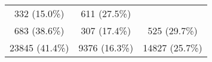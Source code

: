 \documentclass[10pt,]{article}
\begin{document}
\begin{longtable}[c]{@{}ccc@{}}
\begin{minipage}[t]{0.22\columnwidth}
332 (15.0\%)
\strut\end{minipage} &
\begin{minipage}[t]{0.38\columnwidth}\centering\strut
611 (27.5\%)
\strut\end{minipage}\tabularnewline
\begin{minipage}[t]{0.23\columnwidth}\centering\strut
683 (38.6\%)
\strut\end{minipage} &
\begin{minipage}[t]{0.22\columnwidth}\centering\strut
307 (17.4\%)
\strut\end{minipage} &
\begin{minipage}[t]{0.38\columnwidth}\centering\strut
525 (29.7\%)
\strut\end{minipage}\tabularnewline
\begin{minipage}[t]{0.23\columnwidth}\centering\strut
23845 (41.4\%)
\strut\end{minipage} &
\begin{minipage}[t]{0.22\columnwidth}\centering\strut
9376 (16.3\%)
\strut\end{minipage} &
\begin{minipage}[t]{0.38\columnwidth}\centering\strut
14827 (25.7\%)
\strut\end{minipage}\tabularnewline
\bottomrule
\end{longtable}
\end{document}

